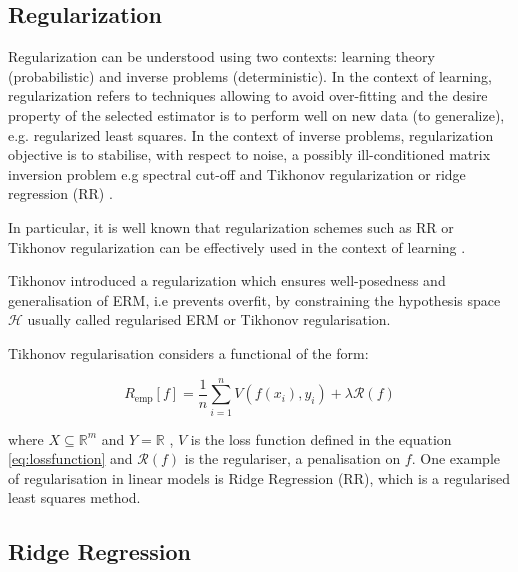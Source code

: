 

\subsection{Regularization}\label{sec:regularization}

Regularization can be understood using two contexts: learning theory
(probabilistic) and inverse problems (deterministic). In the context of
learning, regularization refers to techniques allowing to avoid over-fitting and
the desire property of the selected estimator is to perform well on new data (to
generalize), e.g. regularized least squares. In the context of inverse problems,
regularization objective is to stabilise, with respect to noise, a possibly
ill-conditioned matrix inversion problem e.g spectral cut-off and Tikhonov
regularization or ridge regression (RR) \cite{ tikhonov1977}.

In particular, it is well known that regularization schemes such as RR or
Tikhonov regularization can be effectively used in the context of learning
\cite{vito2005}.

Tikhonov introduced a regularization which ensures well-posedness and
generalisation of ERM, i.e prevents overfit, by constraining the hypothesis
space $\mathscr{H}$ usually called regularised ERM or Tikhonov regularisation.

Tikhonov regularisation considers a functional of the form:

\begin{equation} 
\label{eq:rerm}
R_{\text{emp}}[f] = \frac{1}{n} \sum_{i=1}^n V(f(x_i),y_i) + \lambda \mathcal{R}(f)
\end{equation}

\noindent where $X \subseteq \mathbb{R}^m$ and $Y = \mathbb{R}$ , $V$ is the
loss function defined in the equation \ref{eq:lossfunction} and $\mathcal{R}(f)$
is the regulariser, a penalisation on $f$. One example of regularisation in
linear models is Ridge Regression (RR), which is a regularised least squares
method.

\subsection{Ridge Regression}

